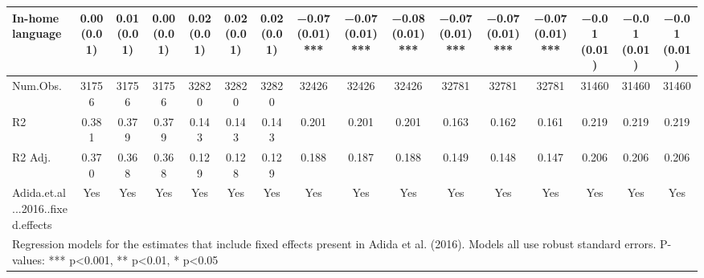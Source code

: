 \begin{table}
\begin{tabular}[t]{lccccccccccccccc}
In-home language & \num{0.00} (\num{0.01}) & \num{0.01} (\num{0.01}) & \num{0.00} (\num{0.01}) & \num{0.02} (\num{0.01}) & \num{0.02} (\num{0.01}) & \num{0.02} (\num{0.01}) & \num{-0.07} (\num{0.01})*** & \num{-0.07} (\num{0.01})*** & \num{-0.08} (\num{0.01})*** & \num{-0.07} (\num{0.01})*** & \num{-0.07} (\num{0.01})*** & \num{-0.07} (\num{0.01})*** & \num{-0.01} (\num{0.01}) & \num{-0.01} (\num{0.01}) & \num{-0.01} (\num{0.01})\\
\midrule
Num.Obs. & \num{31756} & \num{31756} & \num{31756} & \num{32820} & \num{32820} & \num{32820} & \num{32426} & \num{32426} & \num{32426} & \num{32781} & \num{32781} & \num{32781} & \num{31460} & \num{31460} & \num{31460}\\
R2 & \num{0.381} & \num{0.379} & \num{0.379} & \num{0.143} & \num{0.143} & \num{0.143} & \num{0.201} & \num{0.201} & \num{0.201} & \num{0.163} & \num{0.162} & \num{0.161} & \num{0.219} & \num{0.219} & \num{0.219}\\
R2 Adj. & \num{0.370} & \num{0.368} & \num{0.368} & \num{0.129} & \num{0.128} & \num{0.129} & \num{0.188} & \num{0.187} & \num{0.188} & \num{0.149} & \num{0.148} & \num{0.147} & \num{0.206} & \num{0.206} & \num{0.206}\\
Adida.et.al...2016..fixed.effects & Yes & Yes & Yes & Yes & Yes & Yes & Yes & Yes & Yes & Yes & Yes & Yes & Yes & Yes & Yes\\
\bottomrule
\multicolumn{16}{l}{\rule{0pt}{1em}Regression models for the estimates that include fixed effects present in Adida et al. (2016). Models all use robust standard errors. P-values: *** p<0.001, ** p<0.01, * p<0.05}\\
\end{tabular}
\end{table}
